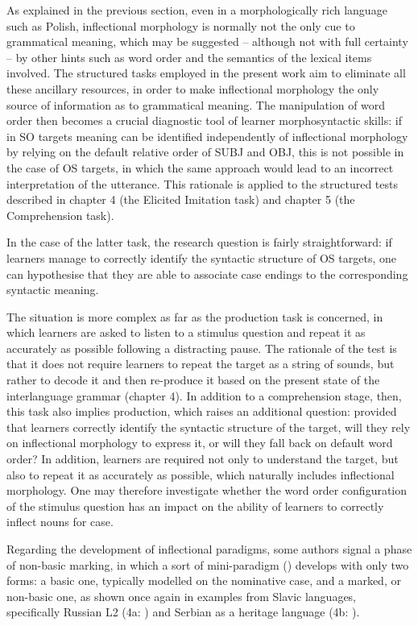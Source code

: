 As explained in the previous section, even in a morphologically rich language such as Polish, inflectional morphology is normally not the only cue to grammatical meaning, which may be suggested – although not with full certainty – by other hints such as word order and the semantics of the lexical items involved. The structured tasks employed in the present work aim to eliminate all these ancillary resources, in order to make inflectional morphology the only source of information as to grammatical meaning. The manipulation of word order then becomes a crucial diagnostic tool of learner morphosyntactic skills: if in SO targets meaning can be identified independently of inflectional morphology by relying on the default relative order of SUBJ and OBJ, this is not possible in the case of OS targets, in which the same approach would lead to an incorrect interpretation of the utterance. This rationale is applied to the structured tests described in chapter 4 (the Elicited Imitation task) and chapter 5 (the Comprehension task). 

In the case of the latter task, the research question is fairly straightforward: if learners manage to correctly identify the syntactic structure of OS targets, one can hypothesise that they are able to associate case endings to the corresponding syntactic meaning.

The situation is more complex as far as the production task is concerned, in which learners are asked to listen to a stimulus question and repeat it as accurately as possible following a distracting pause. The rationale of the test is that it does not require learners to repeat the target as a string of sounds, but rather to decode it and then re-produce it based on the present state of the interlanguage grammar (chapter 4). In addition to a comprehension stage, then, this task also implies production, which raises an additional question: provided that learners correctly identify the syntactic structure of the target, will they rely on inflectional morphology to express it, or will they fall back on default word order? In addition, learners are required not only to understand the target, but also to repeat it as accurately as possible, which naturally includes inflectional morphology. One may therefore investigate whether the word order configuration of the stimulus question has an impact on the ability of learners to correctly inflect nouns for case.

Regarding the development of inflectional paradigms, some authors signal a phase of non-basic marking, in which a sort of mini-paradigm (\citealt{BittnerEtAl2000}) develops with only two forms: a basic one, typically modelled on the nominative case, and a marked, or non-basic one, as shown once again in examples from Slavic languages, specifically Russian L2 (4a: \citealt[188]{ArtoniMagnani2015}) and Serbian as a heritage language (4b: \citealt{Di-BiaseBettoni2015}). 

